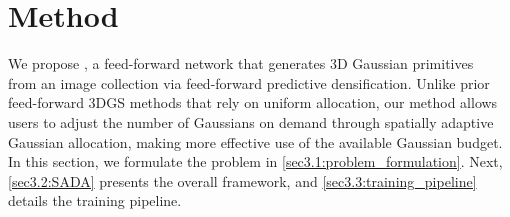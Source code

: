 \section{Method}
We propose \textbf{\OURMODEL}, a feed-forward network that generates 3D Gaussian primitives~\cite{kerbl20233dgs} from an image collection via feed-forward predictive densification.
Unlike prior feed-forward 3DGS methods that rely on uniform allocation, our method allows users to adjust the number of Gaussians on demand through spatially adaptive Gaussian allocation, making more effective use of the available Gaussian budget.
In this section, we formulate the problem in \cref{sec3.1:problem_formulation}. Next, \cref{sec3.2:SADA} presents the overall framework, and \cref{sec3.3:training_pipeline} details the training pipeline.



